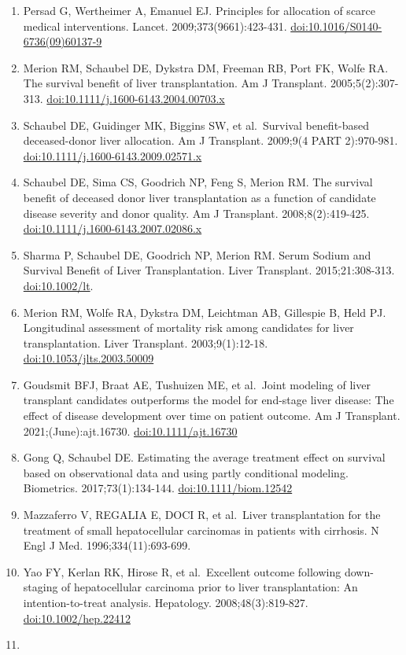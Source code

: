 \documentclass[11pt,english,]{book} %
\begin{document}
\begin{enumerate}
\item
  Persad G, Wertheimer A, Emanuel EJ. Principles for allocation of scarce medical interventions. Lancet. 2009;373(9661):423-431. \url{doi:10.1016/S0140-6736(09)60137-9}
\item
  Merion RM, Schaubel DE, Dykstra DM, Freeman RB, Port FK, Wolfe RA. The survival benefit of liver transplantation. Am J Transplant. 2005;5(2):307-313. \url{doi:10.1111/j.1600-6143.2004.00703.x}
\item
  Schaubel DE, Guidinger MK, Biggins SW, et al.~Survival benefit-based deceased-donor liver allocation. Am J Transplant. 2009;9(4 PART 2):970-981. \url{doi:10.1111/j.1600-6143.2009.02571.x}
\item
  Schaubel DE, Sima CS, Goodrich NP, Feng S, Merion RM. The survival benefit of deceased donor liver transplantation as a function of candidate disease severity and donor quality. Am J Transplant. 2008;8(2):419-425. \url{doi:10.1111/j.1600-6143.2007.02086.x}
\item
  Sharma P, Schaubel DE, Goodrich NP, Merion RM. Serum Sodium and Survival Benefit of Liver Transplantation. Liver Transplant. 2015;21:308-313. \url{doi:10.1002/lt}.
\item
  Merion RM, Wolfe RA, Dykstra DM, Leichtman AB, Gillespie B, Held PJ. Longitudinal assessment of mortality risk among candidates for liver transplantation. Liver Transplant. 2003;9(1):12-18. \url{doi:10.1053/jlts.2003.50009}
\item
  Goudsmit BFJ, Braat AE, Tushuizen ME, et al.~Joint modeling of liver transplant candidates outperforms the model for end-stage liver disease: The effect of disease development over time on patient outcome. Am J Transplant. 2021;(June):ajt.16730. \url{doi:10.1111/ajt.16730}
\item
  Gong Q, Schaubel DE. Estimating the average treatment effect on survival based on observational data and using partly conditional modeling. Biometrics. 2017;73(1):134-144. \url{doi:10.1111/biom.12542}
\item
  Mazzaferro V, REGALIA E, DOCI R, et al.~Liver transplantation for the treatment of small hepatocellular carcinomas in patients with cirrhosis. N Engl J Med. 1996;334(11):693-699.
\item
  Yao FY, Kerlan RK, Hirose R, et al.~Excellent outcome following down-staging of hepatocellular carcinoma prior to liver transplantation: An intention-to-treat analysis. Hepatology. 2008;48(3):819-827. \url{doi:10.1002/hep.22412}
\item

\end{enumerate}
\end{document}
